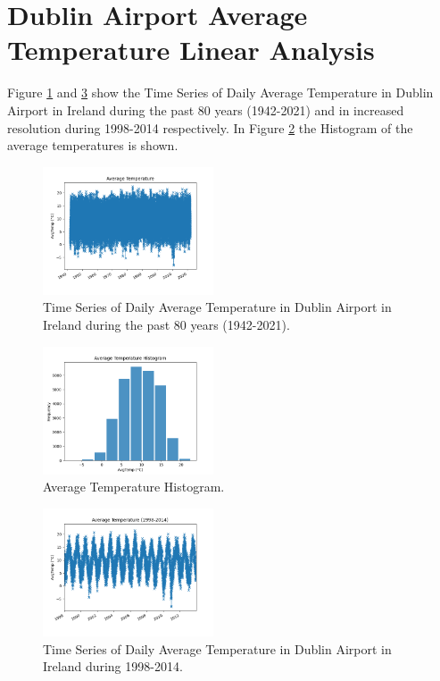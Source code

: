 \documentclass[conference]{IEEEtran}
\begin{document}
\section{Dublin Airport Average Temperature \break Linear Analysis}

Figure \ref{temp} and \ref{tempzoom} show the Time Series of Daily Average Temperature in Dublin Airport in Ireland during the past 80 years (1942-2021) and in increased resolution during 1998-2014 respectively. In Figure \ref{temphist} the Histogram of the average temperatures is shown.

\begin{figure}[ht]
    \centering
    \includegraphics[width=0.45\textwidth]{Figures/Average Temperature Time Series.png}
    \caption{Time Series of Daily Average Temperature in Dublin Airport in Ireland during the past 80 years (1942-2021).}
    \label{temp}
\end{figure}
\vspace{40mm}

\begin{figure}[ht]
    \centering
    \includegraphics[width=0.45\textwidth]{Figures/Average Temperature Histogram.png}
    \caption{Average Temperature Histogram.}
    \label{temphist}
\end{figure}

\begin{figure}[ht]
    \centering
    \includegraphics[width=0.45\textwidth]{Figures/Average Temperature (1998-2014) Time Series.png}
    \caption{Time Series of Daily Average Temperature in Dublin Airport in Ireland during 1998-2014.}
    \label{tempzoom}
\end{figure}
\end{document}
